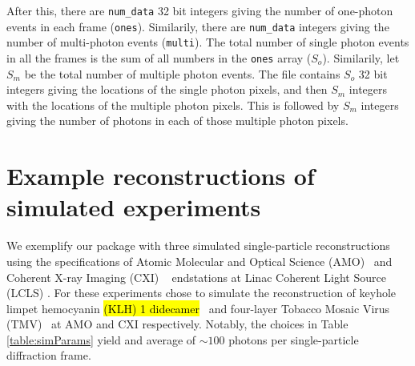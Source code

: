 \documentclass[]{iucr}              %
\begin{document}
After this, there are \texttt{num\_data} 32 bit integers giving the number of one-photon events in each frame (\texttt{ones}). Similarily, there are \texttt{num\_data} integers giving the number of multi-photon events (\texttt{multi}). The total number of single photon events in all the frames is the sum of all numbers in the \texttt{ones} array ($S_o$). Similarily, let $S_m$ be the total number of multiple photon events. The file contains $S_o$ 32 bit integers giving the locations of the single photon pixels, and then $S_m$ integers with the locations of the multiple photon pixels. This is followed by $S_m$ integers giving the number of photons in each of those multiple photon pixels. 

\section{Example reconstructions of simulated experiments}\label{sec:simulations}

We exemplify our package with three simulated single-particle reconstructions using the specifications of Atomic Molecular and Optical Science (AMO)~\cite{ferguson2015} and Coherent X-ray Imaging (CXI) ~\cite{liang2015} endstations at Linac Coherent Light Source (LCLS) \cite{Emma2010}. For these experiments chose to simulate the reconstruction of keyhole limpet hemocyanin \hl{(KLH) 1 didecamer}~\cite{gatsogiannis2009} and four-layer Tobacco Mosaic Virus (TMV)~\cite{bhyravbhatla1998} at AMO and CXI respectively. Notably, the choices in Table \ref{table:simParams} yield and average of $\sim 100$ photons per single-particle diffraction frame.
\end{document}
